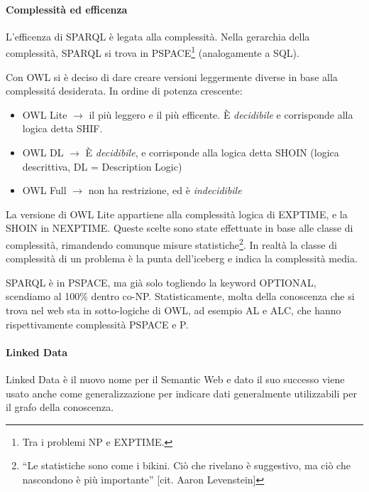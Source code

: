 \paragraph*{Complessit\`a ed efficenza}L'efficenza di SPARQL \`e legata alla complessit\`a. Nella gerarchia della complessit\`a, SPARQL si trova in PSPACE\footnote{Tra i problemi NP e EXPTIME.} (analogamente a SQL).

Con OWL si \`e deciso di dare creare versioni leggermente diverse in base alla complessit\'a desiderata. In ordine di potenza crescente:
\begin{itemize}

\item OWL Lite $\to$ il pi\`u leggero e il pi\`u efficente. \`E \textit{decidibile} e corrisponde alla logica detta SHIF.
\item OWL DL $\to$ \`E \textit{decidibile}, e corrisponde alla logica detta SHOIN (logica descrittiva, DL = Description Logic)
\item OWL Full $\to$ non ha restrizione, ed \`e \textit{indecidibile}
  
\end{itemize}

La versione di OWL Lite appartiene alla complessit\`a logica di EXPTIME, e la SHOIN in NEXPTIME. Queste scelte sono state effettuate in base alle classe di complessit\`a, rimandendo comunque misure statistiche\footnote{``Le statistiche sono come i bikini. Ci\`o che rivelano \`e suggestivo, ma ci\`o che nascondono \`e pi\`u importante'' [cit. Aaron Levenstein]}. In realt\`a la classe di complessit\`a di un problema \`e la punta dell'iceberg e indica la complessit\`a media.


SPARQL \`e in PSPACE, ma gi\`a solo togliendo la keyword OPTIONAL, scendiamo al 100\% dentro co-NP. Statisticamente, molta della conoscenza che si trova nel web sta in sotto-logiche di OWL, ad esempio AL e ALC, che hanno rispettivamente complessit\`a PSPACE e P.

\paragraph*{Linked Data}Linked Data \`e il nuovo nome per il Semantic Web e dato il suo successo viene usato anche come generalizzazione per indicare dati generalmente utilizzabili per il grafo della conoscenza.

